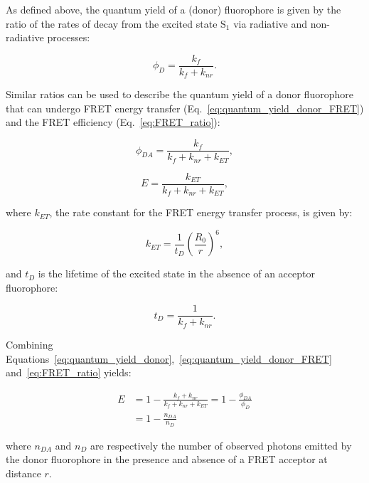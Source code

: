 As defined above, the quantum yield of a (donor) fluorophore is given by the ratio of the rates of decay from the excited state $\text{S}_1$ via radiative and non-radiative processes: 

\begin{equation}
\phi_D = \frac{k_f}{k_f + k_{nr}}.
\label{eq:quantum_yield_donor}
\end{equation}

Similar ratios can be used to describe the quantum yield of a donor fluorophore that can undergo FRET energy transfer (Eq.~\ref{eq:quantum_yield_donor_FRET}) and the FRET efficiency (Eq.~\ref{eq:FRET_ratio}):

\begin{equation}
\phi_{DA} = \frac{k_f}{k_f + k_{nr} + k_{ET}},
\label{eq:quantum_yield_donor_FRET}
\end{equation}

\begin{equation}
E = \frac{k_{ET}}{k_f + k_{nr} + k_{ET}},
\label{eq:FRET_ratio}
\end{equation}

where $k_{ET}$, the rate constant for the FRET energy transfer process, is given by:

\begin{equation}
k_{ET} = \frac{1}{t_D} \left(\frac{R_0}{r}\right)^6,
\label{eq:k_ET}
\end{equation}

and $t_D$ is the lifetime of the excited state in the absence of an acceptor fluorophore: 

\begin{equation}
t_D = \frac{1}{k_{f} + k_{nr}}.
\label{eq:ex_lifetime}
\end{equation}

Combining Equations~\ref{eq:quantum_yield_donor},~\ref{eq:quantum_yield_donor_FRET} and~\ref{eq:FRET_ratio} yields:

\begin{equation}
\begin{split}
E &= 1 - \frac{k_{f} + k_{nr}}{k_f + k_{nr} + k_{ET}} = 1 - \frac{\phi_{DA}}{\phi_{D}} \\
&= 1 - \frac{n_{DA}}{n_{D}}
\label{eq:FRET_ratio_2}
\end{split}
\end{equation}

where $n_{DA}$ and $n_D$ are respectively the number of observed photons emitted by the donor fluorophore in the presence and absence of a FRET acceptor at distance $r$.


